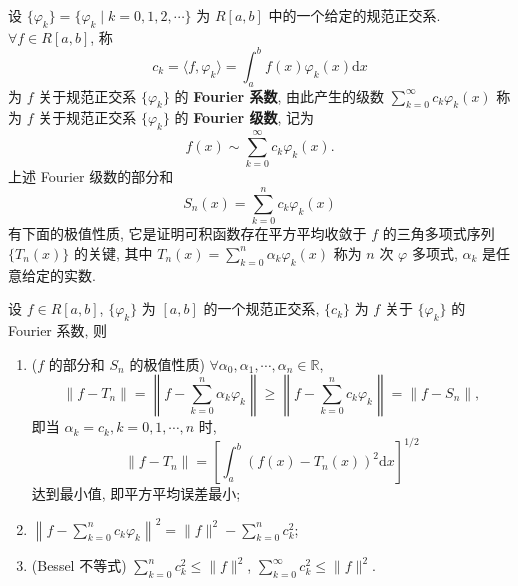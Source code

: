 \begin{definition}\label{def:16.2.3}
设 $\{\varphi_k\} = \{\varphi_k \mid k = 0, 1, 2, \cdots\}$ 为 $R[a, b]$ 中的一个给定的规范正交系. $\forall f \in R[a, b]$, 称
\[
  c_{k}=\langle f,\varphi_{k}\rangle=\int_{a}^{b}f(x)\varphi_{k}(x)\mathrm{d}x
\]
为 $f$ 关于规范正交系 $\{\varphi_{k}\}$ 的 \textbf{Fourier 系数}, 由此产生的级数 $\sum_{k=0}^{\infty} c_{k}\varphi_{k}(x)$ 称为 $f$ 关于规范正交系 $\{\varphi_{k}\}$ 的 \textbf{Fourier 级数}, 记为
\[
  f(x)\sim\sum_{k=0}^{\infty}c_{k}\varphi_{k}(x).
\]
上述 Fourier 级数的部分和
\[
  S_{n}(x)=\sum_{k=0}^{n}c_{k}\varphi_{k}(x)
\]
有下面的极值性质, 它是证明可积函数存在平方平均收敛于 $f$ 的三角多项式序列 $\{T_{n}(x)\}$ 的关键, 其中 $T_{n}(x)=\sum_{k=0}^{n}\alpha_{k}\varphi_{k}(x)$ 称为 $n$ 次 $\varphi$ 多项式, $\alpha_{k}$ 是任意给定的实数.
\end{definition}

\begin{theorem}\label{thm:16.2.5}
设 $f \in R[a, b]$, $\{\varphi_k\}$ 为 $[a, b]$ 的一个规范正交系, $\{c_k\}$ 为 $f$ 关于 $\{\varphi_k\}$ 的 Fourier 系数, 则
\begin{enumerate}
  \item ($f$ 的部分和 $S_{n}$ 的极值性质) $\forall \alpha_{0}, \alpha_{1}, \cdots, \alpha_{n} \in \mathbb{R}$,
  \[
    \|f-T_{n}\|=\left\|f-\sum_{k=0}^{n}\alpha_{k}\varphi_{k}\right\|\geqslant\left\|f-\sum_{k=0}^{n}c_{k}\varphi_{k}\right\|=\|f-S_n\|,
\]
  即当 $\alpha_{k}=c_{k}, k=0,1,\cdots,n$ 时,
  \[
    \| f-T_{n}\|=\left[\int_{a}^{b}(f(x)-T_{n}(x))^{2}\mathrm{d}x\right]^{1/2}
\]
  达到最小值, 即平方平均误差最小;
  \item $\left\|f - \sum_{k=0}^{n} c_{k}\varphi_{k}\right\|^{2} = \|f\|^{2} - \sum_{k=0}^{n} c_{k}^{2}$;
  \item (Bessel 不等式) $\sum_{k=0}^{n} c_{k}^{2} \leqslant \| f \|^{2}$, $\sum_{k=0}^{\infty} c_{k}^{2} \leqslant \| f \|^{2}$.
\end{enumerate}
\end{theorem}

